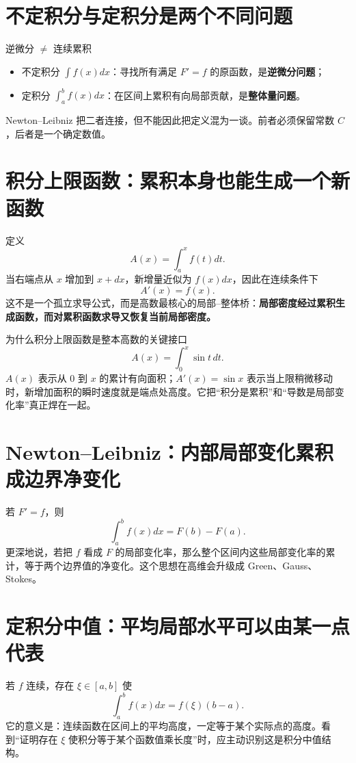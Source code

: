 \documentclass[11pt,a4paper,openany]{ctexbook}
\newcommand{\key}[1]{\textbf{\color{deep}#1}}
\begin{document}
\section{不定积分与定积分是两个不同问题}
\begin{boundarybox}{逆微分 $\neq$ 连续累积}
\begin{itemize}
  \item 不定积分 $\int f(x)dx$：寻找所有满足 $F'=f$ 的原函数，是\key{逆微分问题}；
  \item 定积分 $\int_a^b f(x)dx$：在区间上累积有向局部贡献，是\key{整体量问题}。
\end{itemize}
Newton--Leibniz 把二者连接，但不能因此把定义混为一谈。前者必须保留常数 $C$，后者是一个确定数值。
\end{boundarybox}

\section{积分上限函数：累积本身也能生成一个新函数}
定义
\[
A(x)=\int_a^x f(t)dt.
\]
当右端点从 $x$ 增加到 $x+dx$，新增量近似为 $f(x)dx$，因此在连续条件下
\[
\boxed{A'(x)=f(x)}.
\]
这不是一个孤立求导公式，而是高数最核心的局部--整体桥：\key{局部密度经过累积生成函数，而对累积函数求导又恢复当前局部密度。}

\begin{examplebox}{为什么积分上限函数是整本高数的关键接口}
\[
A(x)=\int_0^x \sin t\,dt.
\]
$A(x)$ 表示从 0 到 $x$ 的累计有向面积；$A'(x)=\sin x$ 表示当上限稍微移动时，新增加面积的瞬时速度就是端点处高度。它把“积分是累积”和“导数是局部变化率”真正焊在一起。
\end{examplebox}

\section{Newton--Leibniz：内部局部变化累积成边界净变化}
若 $F'=f$，则
\[
\boxed{\int_a^b f(x)dx=F(b)-F(a)}.
\]
更深地说，若把 $f$ 看成 $F$ 的局部变化率，那么整个区间内这些局部变化率的累计，等于两个边界值的净变化。这个思想在高维会升级成 Green、Gauss、Stokes。

\section{定积分中值：平均局部水平可以由某一点代表}
若 $f$ 连续，存在 $\xi\in[a,b]$ 使
\[
\int_a^b f(x)dx=f(\xi)(b-a).
\]
它的意义是：连续函数在区间上的平均高度，一定等于某个实际点的高度。看到“证明存在 $\xi$ 使积分等于某个函数值乘长度”时，应主动识别这是积分中值结构。
\end{document}
